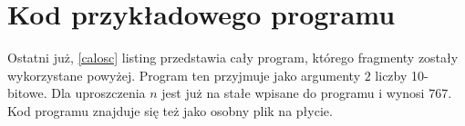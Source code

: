 \documentclass[a4paper]{article}
\begin{document}

\section{Kod przykładowego programu}
Ostatni już, \ref{calosc} listing przedstawia cały program, którego fragmenty zostały wykorzystane powyżej. Program ten przyjmuje
jako argumenty $2$ liczby 10-bitowe. Dla uproszczenia $n$ jest już na stałe wpisane do programu i wynosi $767$. Kod programu
znajduje się też jako osobny plik na płycie.
\end{document}
